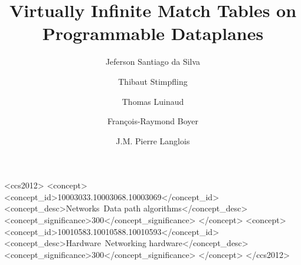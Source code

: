 \documentclass[sigconf,natbib=false,anonymous=false,screen]{acmart}
\begin{document}
\title{Virtually Infinite Match Tables on Programmable Dataplanes}

\author{Jeferson Santiago da Silva}


\author{Thibaut Stimpfling}

\author{Thomas Luinaud}

\author{Fran\c{c}ois-Raymond Boyer}


\author{J.M. Pierre Langlois}




\begin{abstract}

\end{abstract}

 \begin{CCSXML}
	<ccs2012>
	<concept>
	<concept_id>10003033.10003068.10003069</concept_id>
	<concept_desc>Networks~Data path algorithms</concept_desc>
	<concept_significance>300</concept_significance>
	</concept>
	<concept>
	<concept_id>10010583.10010588.10010593</concept_id>
	<concept_desc>Hardware~Networking hardware</concept_desc>
	<concept_significance>300</concept_significance>
	</concept>
	</ccs2012>
\end{CCSXML}
\end{document}
